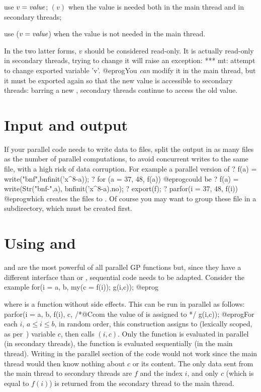 \item use $v = \hbox{\it value\/}$; $(v)$ when the value
  is needed both in the main thread and in secondary threads;

\item use ($v = \hbox{\it value\/}$) when the value is
  not needed in the main thread.

\noindent In the two latter forms, $v$ should be considered read-only. It is
actually read-only in secondary threads, trying to change it will raise an
exception:
\bprog
  ***   mt: attempt to change exported variable 'v'.
@eprog\noindent You \emph{can} modify it in the main thread, but it must be
exported again so that the new value is accessible to secondary threads:
barring a new , secondary threads continue to access the old value.

\section{Input and output} If your parallel code needs to write data to
files, split the output in as many files as the number of parallel
computations, to avoid concurrent writes to the same file, with a high risk
of data corruption. For example a parallel version of
\bprog
? f(a) = write("bnf",bnfinit('x^8-a));
? for (a = 37, 48, f(a))
@eprog\noindent could be
\bprog
? f(a) = write(Str("bnf-",a), bnfinit('x^8-a).no);
? export(f);
? parfor(i = 37, 48, f(i))
@eprog\noindent which creates the files  to . Of
course you may want to group these file in a subdirectory, which must be
created first.

\section{Using  and }
 and  are the most powerful of all parallel GP
functions but, since they have a different interface than  or
, sequential code needs to be adapted. Consider the example
\bprog
for(i = a, b,
  my(c = f(i));
  g(i,c));
@eprog\noindent

where  is a function without side effects.  This can be run in parallel
as follows:
\bprog
parfor(i = a, b,
  f(i),
  c,     /*@Ccom the value of  is assigned to  */
  g(i,c));
@eprog\noindent For each $i$, $a \leq i \leq b$, in random order,
this construction assigns  to (lexically scoped, as per~)
variable $c$, then calls $(i,c)$. Only the function  is
evaluated in parallel (in secondary threads), the function  is
evaluated sequentially (in the main thread). Writing  in the
parallel section of the code would not work since the main thread would then
know nothing about $c$ or its content. The only data sent from the main
thread to secondary threads are $f$ and the index $i$, and only $c$ (which
is equal to $f(i)$) is returned from the secondary thread to the main thread.

